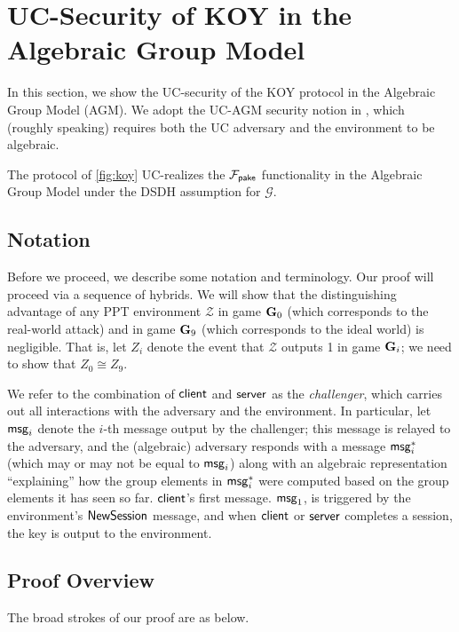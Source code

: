 \section{UC-Security of KOY in the Algebraic Group Model}

In this section, we show the UC-security of the KOY protocol in the Algebraic Group Model (AGM). We adopt the UC-AGM security notion in \cite{AC:ABKLX21}, which (roughly speaking) requires both the UC adversary and the environment to be algebraic.

\begin{theorem}
	\label{thm:agm}
	The protocol of \cref{fig:koy} UC-realizes the $\mathcal{F}_{\mathsf{pake}}$ functionality in the Algebraic Group Model under the DSDH assumption for $\mathcal{G}$.
\end{theorem}

\subsection{Notation}

Before we proceed, we describe some notation and terminology. Our proof will proceed via a sequence of hybrids. We will show that the distinguishing advantage of any PPT environment $\mathcal{Z}$ in game $\mathbf{G}_0$ (which corresponds to the real-world attack) and in game $\mathbf{G}_9$ (which corresponds to the ideal world) is negligible. That is, let $Z_i$ denote the event that $\mathcal{Z}$ outputs 1 in game $\mathbf{G}_i$; we need to show that $Z_0\cong Z_9$.

We refer to the combination of $\mathsf{client}$ and $\mathsf{server}$ as the \textit{challenger}, which carries out all interactions with the adversary and the environment. In particular, let $\mathsf{msg}_{i}$ denote the $i$-th message output by the challenger; this message is relayed to the adversary, and the (algebraic) adversary responds with a message $\mathsf{msg}_{i}^{*}$ (which may or may not be equal to $\mathsf{msg}_{i}$) along with an algebraic representation ``explaining'' how the group elements in $\mathsf{msg}_{i}^*$ were computed based on the group elements it has seen so far. $\mathsf{client}$'s first message. $\mathsf{msg}_{1}$, is triggered by the environment's $\mathsf{NewSession}$ message, and when $\mathsf{client}$ or $\mathsf{server}$ completes a session, the key is output to the environment.

\subsection{Proof Overview}

The broad strokes of our proof are as below.

